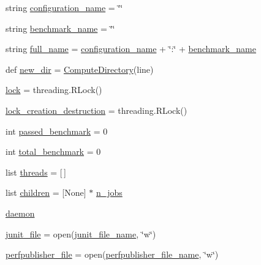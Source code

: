 \begin{DoxyCompactItemize}
\item 
string \hyperlink{namespacetest__panda_ab653321a83e07bf3e50afa94f982010a}{configuration\+\_\+name} = \char`\"{}\char`\"{}
\item 
string \hyperlink{namespacetest__panda_a6adac05e8fa7baf5d3b2f9874ca64d1e}{benchmark\+\_\+name} = \char`\"{}\char`\"{}
\item 
string \hyperlink{namespacetest__panda_a99098d1c922dd11b8a58c871b54d24eb}{full\+\_\+name} = \hyperlink{namespacetest__panda_ab653321a83e07bf3e50afa94f982010a}{configuration\+\_\+name} + \char`\"{}\+:\char`\"{} + \hyperlink{namespacetest__panda_a6adac05e8fa7baf5d3b2f9874ca64d1e}{benchmark\+\_\+name}
\item 
def \hyperlink{namespacetest__panda_a265178f28ffed4a3471bb1ae2ccfa2c8}{new\+\_\+dir} = \hyperlink{namespacetest__panda_aecad727491366ab009da0c1bc773571e}{Compute\+Directory}(line)
\item 
\hyperlink{namespacetest__panda_adefe19732bebd85616aae9464f493d15}{lock} = threading.\+R\+Lock()
\item 
\hyperlink{namespacetest__panda_aceae9d158f2cdcc15b9801da8011d5fd}{lock\+\_\+creation\+\_\+destruction} = threading.\+R\+Lock()
\item 
int \hyperlink{namespacetest__panda_aff0bb6b87817523406e38e7c598cb750}{passed\+\_\+benchmark} = 0
\item 
int \hyperlink{namespacetest__panda_a07b1c4c41270519a99a4ebc617117a0c}{total\+\_\+benchmark} = 0
\item 
list \hyperlink{namespacetest__panda_ae3dc7b036d69d4a16c0a5d932667b884}{threads} = \mbox{[}$\,$\mbox{]}
\item 
list \hyperlink{namespacetest__panda_a0f5aa2c402a9f1b8951cfb79a96f583c}{children} = \mbox{[}None\mbox{]} $\ast$ \hyperlink{namespacetest__panda_aa5fd25c613bf73eb86bd917d77eaa028}{n\+\_\+jobs}
\item 
\hyperlink{namespacetest__panda_ab203de34d853cabc95a744e8466d904b}{daemon}
\item 
\hyperlink{namespacetest__panda_a5d7e53bce2e246d1521629e4d08898fd}{junit\+\_\+file} = open(\hyperlink{namespacetest__panda_aa375f80f1bb5f774d7bcfd9d4ded3f5c}{junit\+\_\+file\+\_\+name}, \char`\"{}w\char`\"{})
\item 
\hyperlink{namespacetest__panda_ad880cf46896ba48f786953489a5fcddb}{perfpublisher\+\_\+file} = open(\hyperlink{namespacetest__panda_ae3bf09732ecacf6c06a7180d67d25a9e}{perfpublisher\+\_\+file\+\_\+name}, \char`\"{}w\char`\"{})
\item 

\end{DoxyCompactItemize}
